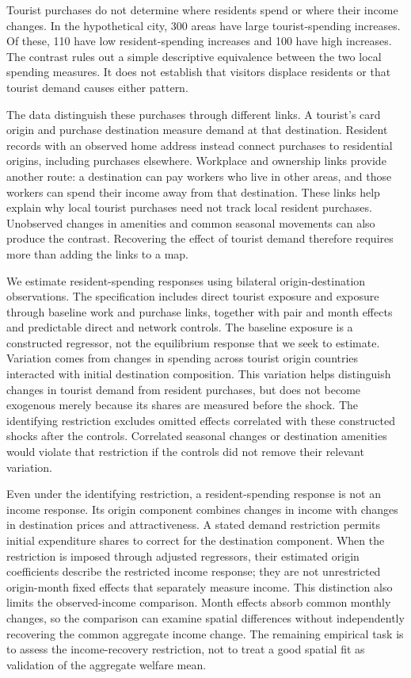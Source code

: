 Tourist purchases do not determine where residents spend or where their income
changes. In the hypothetical city, 300 areas have large tourist-spending increases.
Of these, 110 have low resident-spending increases and 100 have high increases.
The contrast rules out a simple descriptive equivalence between the two local
spending measures. It does not establish that visitors displace residents or that
tourist demand causes either pattern.

The data distinguish these purchases through different links. A tourist's card
origin and purchase destination measure demand at that destination. Resident
records with an observed home address instead connect purchases to residential
origins, including purchases elsewhere. Workplace and ownership links provide
another route: a destination can pay workers who live in other areas, and those
workers can spend their income away from that destination. These links help
explain why local tourist purchases need not track local resident purchases.
Unobserved changes in amenities and common seasonal movements can also produce
the contrast. Recovering the effect of tourist demand therefore requires more
than adding the links to a map.

We estimate resident-spending responses using bilateral origin-destination
observations. The specification includes direct tourist exposure and exposure
through baseline work and purchase links, together with pair and month effects
and predictable direct and network controls. The baseline exposure is a constructed
regressor, not the equilibrium response that we seek to estimate. Variation comes
from changes in spending across tourist origin countries interacted with initial
destination composition. This variation helps distinguish changes in tourist
demand from resident purchases, but does not become exogenous merely because its
shares are measured before the shock. The identifying restriction excludes omitted
effects correlated with these constructed shocks after the controls. Correlated
seasonal changes or destination amenities would violate that restriction if the
controls did not remove their relevant variation.

Even under the identifying restriction, a resident-spending response is not an
income response. Its origin component combines changes in income with changes
in destination prices and attractiveness. A stated demand restriction permits
initial expenditure shares to correct for the destination component. When the
restriction is imposed through adjusted regressors, their estimated origin
coefficients describe the restricted income response; they are not unrestricted
origin-month fixed effects that separately measure income. This distinction also
limits the observed-income comparison. Month effects absorb common monthly
changes, so the comparison can examine spatial differences without independently
recovering the common aggregate income change. The remaining empirical task is
to assess the income-recovery restriction, not to treat a good spatial fit as
validation of the aggregate welfare mean.
